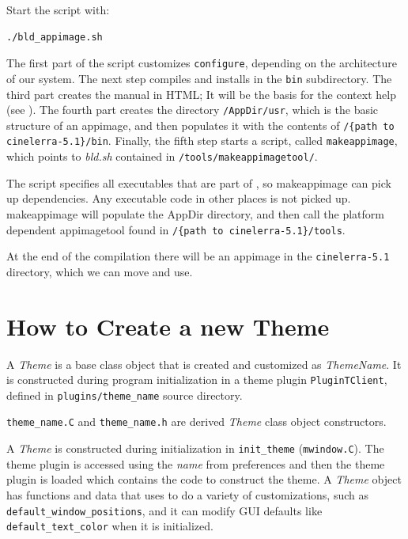 Start the script with:

\begin{lstlisting}[numbers=none]
./bld_appimage.sh
\end{lstlisting}

The first part of the script customizes \texttt{configure}, depending on the architecture of our system. The next step compiles and installs \CGG{} in the \texttt{bin} subdirectory. The third part creates the manual in HTML; It will be the basis for the context help (see ). The fourth part creates the directory \texttt{/AppDir/usr}, which is the basic structure of an appimage, and then populates it with the contents of \texttt{/\{path to cinelerra-5.1\}/bin}. Finally, the fifth step starts a script, called \texttt{makeappimage}, which points to \textit{bld.sh} contained in \texttt{/tools/makeappimagetool/}.

The script specifies all executables that are part of \CGG{}, so makeappimage can pick up dependencies. Any executable code in other places is not picked up. makeappimage will populate the AppDir directory, and then call the platform dependent appimagetool found in \texttt{/\{path to cinelerra-5.1\}/tools}.

At the end of the compilation there will be an appimage in the \texttt{cinelerra-5.1} directory, which we can move and use.

\section{How to Create a new Theme}
\label{sec:how_create_theme}

A \textit{Theme} is a base class object that is created and customized as \textit{ThemeName}.
It is constructed during program initialization in a theme plugin
\texttt{PluginTClient},
defined in \texttt{plugins/theme\_name} source directory.

\texttt{theme\_name.C} and \texttt{theme\_name.h} are derived \textit{Theme} class object constructors.

A \textit{Theme} is constructed during initialization in \texttt{init\_theme} (\texttt{mwindow.C}). The theme plugin is accessed using the \textit{name} from preferences and then the theme plugin is loaded which contains the code to construct the theme.  A \textit{Theme} object has functions and data that \CGG{} uses to do a variety of customizations, such as \texttt{default\_window\_positions}, and it can modify GUI defaults like \\
\texttt{default\_text\_color} when it is initialized.

